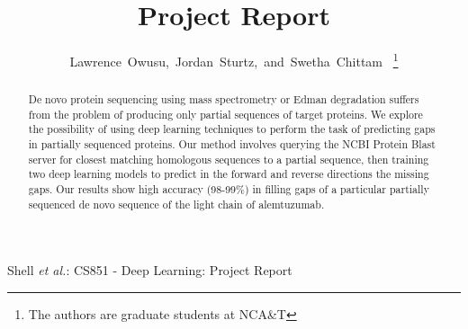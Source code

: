 \documentclass[journal]{IEEEtran}
\begin{document}
%
\title{Project Report}

\author{Lawrence~Owusu,~Jordan~Sturtz,~and~Swetha~Chittam~%
  \thanks{The authors are graduate students at NCA\&T}%
}


%
{Shell \MakeLowercase{\textit{et al.}}: CS851 - Deep Learning: Project Report}

\maketitle

\begin{abstract}
  De novo protein sequencing using mass spectrometry or Edman degradation
  suffers from the problem of producing only partial sequences of target proteins.
  We explore the possibility of using deep learning techniques to perform the 
  task of predicting gaps in partially sequenced proteins. Our method involves
  querying the NCBI Protein Blast server for closest matching homologous sequences
  to a partial sequence, then training two deep learning models to predict
  in the forward and reverse directions the missing gaps. Our results show
  high accuracy (98-99\%) in filling gaps of a particular partially sequenced 
  de novo sequence of the light chain of alemtuzumab.

\end{abstract}


\end{document}
